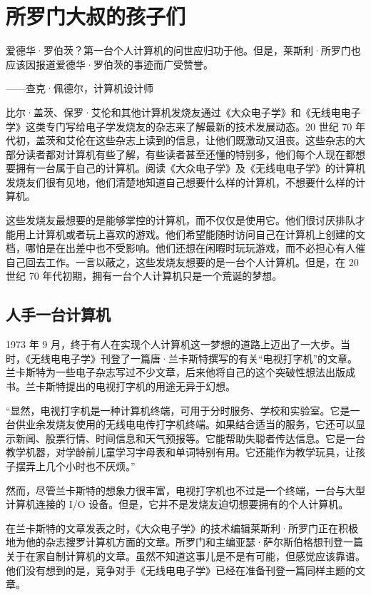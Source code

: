 \documentclass[12pt,UTF8]{ctexbook}
\begin{document}
\section{所罗门大叔的孩子们}


爱德华·罗伯茨？第一台个人计算机的问世应归功于他。但是，莱斯利·所罗门也应该因报道爱德华·罗伯茨的事迹而广受赞誉。

——查克·佩德尔，计算机设计师



比尔·盖茨、保罗·艾伦和其他计算机发烧友通过《大众电子学》和《无线电电子学》这类专门写给电子学发烧友的杂志来了解最新的技术发展动态。20 世纪 70 年代初，盖茨和艾伦在这些杂志上读到的信息，让他们既激动又沮丧。这些杂志的大部分读者都对计算机有些了解，有些读者甚至还懂的特别多，他们每个人现在都想要拥有一台属于自己的计算机。阅读《大众电子学》及《无线电电子学》的计算机发烧友们很有见地，他们清楚地知道自己想要什么样的计算机，不想要什么样的计算机。

这些发烧友最想要的是能够掌控的计算机，而不仅仅是使用它。他们很讨厌排队才能用上计算机或者玩上喜欢的游戏。他们希望能随时访问自己在计算机上创建的文档，哪怕是在出差中也不受影响。他们还想在闲暇时玩玩游戏，而不必担心有人催自己回去工作。一言以蔽之，这些发烧友想要的是一台个人计算机。但是，在 20 世纪 70 年代初期，拥有一台个人计算机只是一个荒诞的梦想。





\subsection{人手一台计算机}


1973 年 9 月，终于有人在实现个人计算机这一梦想的道路上迈出了一大步。当时，《无线电电子学》刊登了一篇唐·兰卡斯特撰写的有关“电视打字机”的文章。兰卡斯特为一些电子杂志写过不少文章，后来他将自己的这个突破性想法出版成书。兰卡斯特提出的电视打字机的用途无异于幻想。

“显然，电视打字机是一种计算机终端，可用于分时服务、学校和实验室。它是一台供业余发烧友使用的无线电电传打字机终端。如果结合适当的服务，它还可以显示新闻、股票行情、时间信息和天气预报等。它能帮助失聪者传达信息。它是一台教学机器，对学龄前儿童学习字母表和单词特别有用。它还能作为教学玩具，让孩子摆弄上几个小时也不厌烦。”

然而，尽管兰卡斯特的想象力很丰富，电视打字机也不过是一个终端，一台与大型计算机连接的 I/O 设备。但是，它并不是发烧友迫切想要拥有的个人计算机。

在兰卡斯特的文章发表之时，《大众电子学》的技术编辑莱斯利·所罗门正在积极地为他的杂志搜罗计算机方面的文章。所罗门和主编亚瑟·萨尔斯伯格想刊登一篇关于在家自制计算机的文章。虽然不知道这事儿是不是有可能，但感觉应该靠谱。他们没有想到的是，竞争对手《无线电电子学》已经在准备刊登一篇同样主题的文章。
\end{document}
